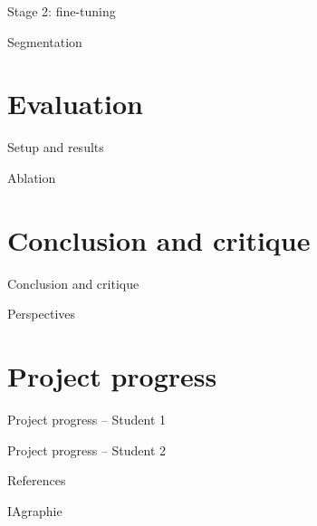 \documentclass[aspectratio=169,10pt]{beamer}
\begin{document}
\begin{frame}{Stage 2: fine-tuning}
\end{frame}

\begin{frame}{Segmentation}
\end{frame}

\section{Evaluation}

\begin{frame}{Setup and results}
\end{frame}

\begin{frame}{Ablation}
\end{frame}

\section{Conclusion and critique}

\begin{frame}{Conclusion and critique}
\end{frame}

\begin{frame}{Perspectives}
\end{frame}

\section{Project progress}

\begin{frame}{Project progress -- Student 1}
\end{frame}

\begin{frame}{Project progress -- Student 2}
\end{frame}

\begin{frame}[allowframebreaks]{References}
  
  \nocite{jing2025hycon}
  
\end{frame}

\begin{frame}{IAgraphie}
\end{frame}
\end{document}
